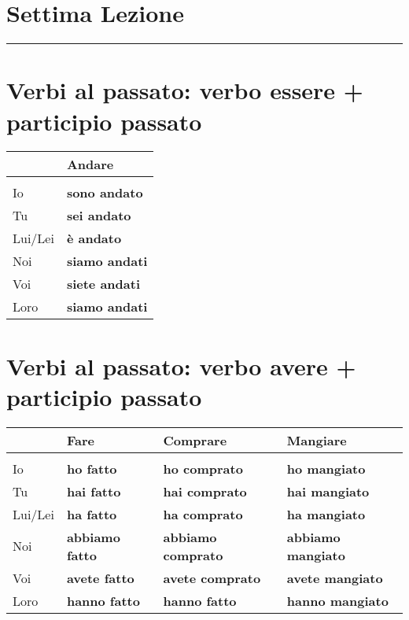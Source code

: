 \documentclass[letter,11pt]{article}
\begin{document}
\section*{\Large{Settima Lezione}}
\noindent\rule{16cm}{1pt}

\setlength{\parindent}{260pt}

\vskip 0.2in
\section*{Verbi al passato: verbo essere + participio passato}
\vskip 0.2in

\begin{tabular}{ |p{2cm}| p{3cm}| }
      & Andare   \\
    \hline
    \hline
     &    \\ \hline
    Io      & {\bf sono andato}     \\ \hline
    Tu      & {\bf sei andato}      \\ \hline
    Lui/Lei & {\bf è andato}        \\ \hline
    Noi     & {\bf siamo andati}    \\ \hline
    Voi     & {\bf siete andati}    \\ \hline
    Loro    & {\bf siamo andati}    \\ \hline
    \hline
\end{tabular}

\vskip 0.2in
\section*{Verbi al passato: verbo avere + participio passato}
\vskip 0.2in

\begin{tabular}{ |p{2cm}| p{4cm}| p{4cm}| p{4cm}| }
      & Fare  & Comprare & Mangiare  \\
    \hline
    \hline
     &  &  & \\ \hline
    Io      & {\bf ho fatto}      & {\bf ho comprato}     &  {\bf ho mangiato} \\ \hline
    Tu      & {\bf hai fatto}     & {\bf hai comprato}  &  {\bf hai mangiato}  \\ \hline
    Lui/Lei & {\bf ha fatto}      & {\bf ha comprato}   &  {\bf ha mangiato}\\ \hline
    Noi     & {\bf abbiamo fatto} & {\bf abbiamo comprato} & {\bf abbiamo mangiato} \\ \hline
    Voi     & {\bf avete fatto}   & {\bf avete comprato}   &  {\bf avete mangiato}  \\ \hline
    Loro    & {\bf hanno fatto}   & {\bf hanno fatto}   &  {\bf hanno mangiato}  \\ \hline
    \hline
\end{tabular}
\end{document}
